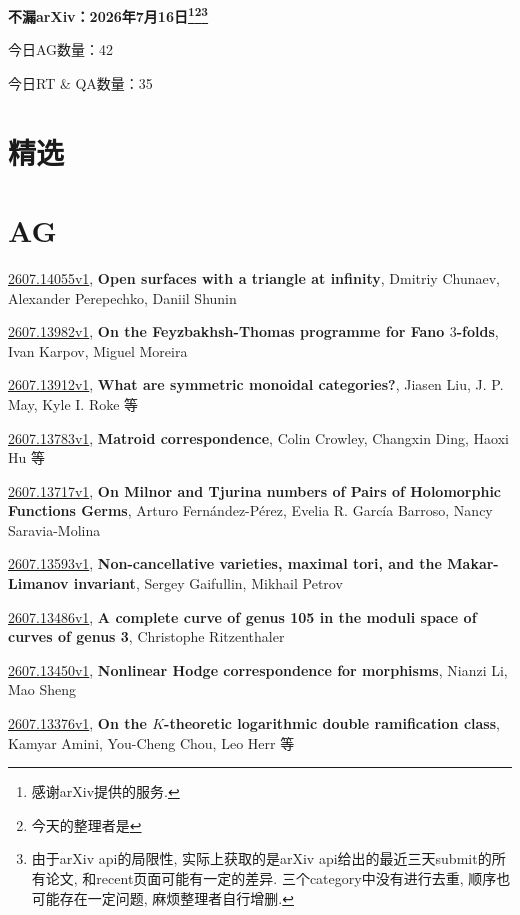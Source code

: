 \documentclass[9pt, a4paper]{article}
\theoremstyle{plain}
\theoremstyle{definition}
\theoremstyle{remark}
\newcommand{\arxiv}[3]{\href{https://arxiv.org/abs/#1}{#1}, \textbf{\textcolor{arxivblue}{#2}}, #3}
\newcommand{\AGnumber}{42}
\newcommand{\RTQAnumber}{35}
\newcommand{\NewestDate}{2026年7月16日}
\newcommand{\todayarXiver}{} %
\begin{document}
\begin{center}
    \Huge\textbf{不漏arXiv：\NewestDate\footnote{感谢arXiv提供的服务.}\footnote{今天的整理者是\todayarXiver}\footnote{由于arXiv api的局限性, 实际上获取的是arXiv api给出的最近三天submit的所有论文, 和recent页面可能有一定的差异. 三个category中没有进行去重, 顺序也可能存在一定问题, 麻烦整理者自行增删.}} \\
\end{center}

\setcounter{section}{-1}

\begin{center}
    今日AG数量：\AGnumber
    
    今日RT \& QA数量：\RTQAnumber
    
\end{center}


\section{精选}


\section{AG}
\arxiv{2607.14055v1}{Open surfaces with a triangle at infinity}{Dmitriy Chunaev, Alexander Perepechko, Daniil Shunin}

\arxiv{2607.13982v1}{On the Feyzbakhsh-Thomas programme for Fano $3$-folds}{Ivan Karpov, Miguel Moreira}

\arxiv{2607.13912v1}{What are symmetric monoidal categories?}{Jiasen Liu, J. P. May, Kyle I. Roke 等}

\arxiv{2607.13783v1}{Matroid correspondence}{Colin Crowley, Changxin Ding, Haoxi Hu 等}

\arxiv{2607.13717v1}{On Milnor and Tjurina numbers of Pairs of Holomorphic Functions Germs}{Arturo Fernández-Pérez, Evelia R. García Barroso, Nancy Saravia-Molina}

\arxiv{2607.13593v1}{Non-cancellative varieties, maximal tori, and the Makar-Limanov invariant}{Sergey Gaifullin, Mikhail Petrov}

\arxiv{2607.13486v1}{A complete curve of genus 105 in the moduli space of curves of genus 3}{Christophe Ritzenthaler}

\arxiv{2607.13450v1}{Nonlinear Hodge correspondence for morphisms}{Nianzi Li, Mao Sheng}

\arxiv{2607.13376v1}{On the $K$-theoretic logarithmic double ramification class}{Kamyar Amini, You-Cheng Chou, Leo Herr 等}
\end{document}
